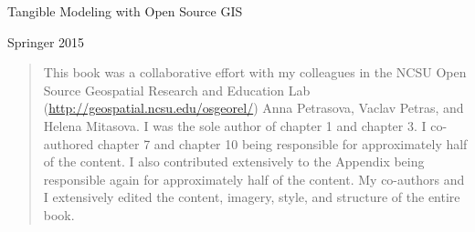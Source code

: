 \documentclass{article}
\begin{document}

\begin{titlepage}
\pagecolor{chaptertitlepagecolor}
\noindent
\color{white}
\large
{\textsf{Tangible Modeling with Open Source GIS}}\\ 
\makebox[0pt][l]{\rule{1.3\textwidth}{1pt}}
\par
\noindent
\textcolor{chapternamecolor}
{\textsf{Springer 2015}}\vfill
\end{titlepage}
\restoregeometry %
\pagecolor{white}

\begin{titlepage}
\vspace{1em}

\begin{quote}
This book was a collaborative effort with my colleagues 
in the NCSU Open Source Geospatial Research and Education Lab
(\url{http://geospatial.ncsu.edu/osgeorel/})
Anna Petrasova, Vaclav Petras, and Helena Mitasova.
I was the sole author of  chapter 1 and chapter 3. 
I co-authored chapter 7 and chapter 10 being responsible for approximately half of the content.
I also contributed extensively to the Appendix being responsible again for approximately half of the content.
My co-authors and I extensively edited the content, imagery, style, and structure of the entire book. 
\end{quote}
\end{titlepage}
\restoregeometry %
\pagecolor{white}
\end{document}
